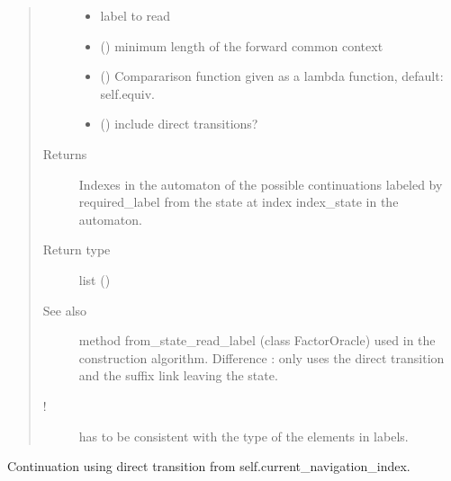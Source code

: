 \documentclass[letterpaper,10pt,english]{sphinxmanual}
\begin{document}
\begin{fulllineitems}
\begin{fulllineitems}
\begin{quote}
\begin{description}
\begin{itemize}
\item {} 
 \textendash{} label to read

\item {} 
 () \textendash{} minimum length of the forward common context

\item {} 
 () \textendash{} Compararison function given as a lambda function, default: self.equiv.

\item {} 
 () \textendash{} include direct transitions?

\end{itemize}

\item[{Returns}] \leavevmode
Indexes in the automaton of the possible continuations labeled by required\_label from the state at index index\_state in the automaton.

\item[{Return type}] \leavevmode
list ()

\item[{See also}] \leavevmode
method from\_state\_read\_label (class FactorOracle) used in the construction algorithm. Difference : only uses the direct transition and the suffix link leaving the state.

\item[{!}] \leavevmode
{} has to be consistent with the type of the elements in labels.

\end{description}\end{quote}

\end{fulllineitems}


\begin{fulllineitems}
\label{\detokenize{index:Model.FactorOracle.follow_continuation_using_transition}}
Continuation using direct transition from self.current\_navigation\_index.


\end{fulllineitems}
\end{fulllineitems}
\end{document}
